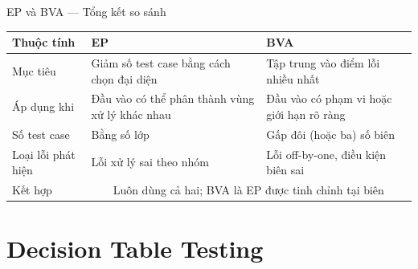 \documentclass[aspectratio=169,12pt]{beamer}
\begin{document}
\begin{frame}{EP và BVA --- Tổng kết so sánh}
  \begin{center}
  \begin{tabular}{p{2.5cm}p{4.5cm}p{4cm}}
    \toprule
    \textbf{Thuộc tính} & \textbf{EP} & \textbf{BVA} \\
    \midrule
    Mục tiêu     & Giảm số test case bằng cách chọn đại diện & Tập trung vào điểm lỗi nhiều nhất \\
    Áp dụng khi  & Đầu vào có thể phân thành vùng xử lý khác nhau & Đầu vào có phạm vi hoặc giới hạn rõ ràng \\
    Số test case & Bằng số lớp & Gấp đôi (hoặc ba) số biên \\
    Loại lỗi phát hiện & Lỗi xử lý sai theo nhóm & Lỗi off-by-one, điều kiện biên sai \\
    Kết hợp      & \multicolumn{2}{c}{Luôn dùng cả hai; BVA là EP được tinh chỉnh tại biên} \\
    \bottomrule
  \end{tabular}
  \end{center}
\end{frame}

\section{Decision Table Testing}
\end{document}

